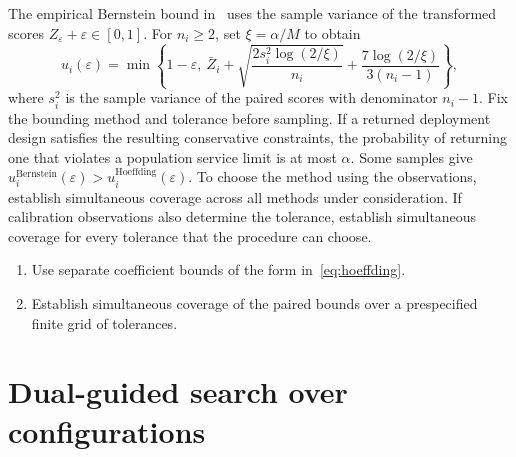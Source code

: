 \documentclass[11pt,reqno]{amsart}
\theoremstyle{definition}
\theoremstyle{remark}
\begin{document}
The empirical Bernstein bound in~\cite[Theorem~4]{maurerPontil} uses the sample variance of the transformed scores $Z_\varepsilon+\varepsilon\in[0,1]$.
For $n_i\ge2$, set $\xi=\alpha/M$ to obtain
\[
 u_i(\varepsilon)=\min\left\{1-\varepsilon,\ \bar Z_i+
 \sqrt{\frac{2s_i^2\log(2/\xi)}{n_i}}+
 \frac{7\log(2/\xi)}{3(n_i-1)}\right\},
\]
where $s_i^2$ is the sample variance of the paired scores with denominator $n_i-1$.
Fix the bounding method and tolerance before sampling. If a returned deployment design satisfies the resulting conservative constraints, the probability of returning one that violates a population service limit is at most $\alpha$.
Some samples give $u_i^{\mathrm{Bernstein}}(\varepsilon)>u_i^{\mathrm{Hoeffding}}(\varepsilon)$.
To choose the method using the observations, establish simultaneous coverage across all methods under consideration.
If calibration observations also determine the tolerance, establish simultaneous coverage for every tolerance that the procedure can choose.
\begin{enumerate}
\item Use separate coefficient bounds of the form in~\eqref{eq:hoeffding}.
\item Establish simultaneous coverage of the paired bounds over a prespecified finite grid of tolerances.
\end{enumerate}

\section{Dual-guided search over configurations}
\label{sec:pricing}
\end{document}
